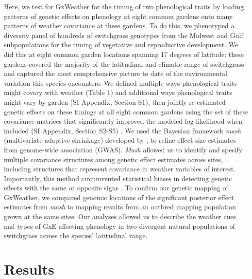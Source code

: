 \documentclass[
  9pt,
  twocolumn,
  twoside]{simple-article}%
\begin{document}
Here, we test for GxWeather for the timing of two phenological traits by
loading patterns of genetic effects on phenology at eight common gardens
onto many patterns of weather covariance at these gardens. To do this,
we phenotyped a diversity panel of hundreds of switchgrass genotypes
from the Midwest and Gulf subpopulations for the timing of vegetative
and reproductive development. We did this at eight common garden
locations spanning 17 degrees of latitude: these gardens covered the
majority of the latitudinal and climatic range of switchgrass and
captured the most comprehensive picture to date of the environmental
variation this species encounters. We defined multiple ways phenological
traits might covary with weather (Table 1) and additional ways
phenological traits might vary by garden (SI Appendix, Section S1), then
jointly re-estimated genetic effects on these timings at all eight
common gardens using the set of these covariance matrices that
significantly improved the modeled log-likelihood when included (SI
Appendix, Section S2-S5) \citet{urbut2019flexible}. We used the Bayesian
framework \emph{mash} (multivariate adaptive shrinkage) developed by
\citet{urbut2019flexible}, to refine effect size estimates from
genome-wide association (GWAS). \emph{Mash} allowed us to identify and
specify multiple covariance structures among genetic effect estimates
across sites, including structures that represent covariance in weather
variables of interest. Importantly, this method circumvented statistical
biases in detecting genetic effects with the same or opposite signs
\citet{10.1093/biostatistics/kxw041}. To confirm our genetic mapping of
GxWeather, we compared genomic locations of the significant posterior
effect estimates from \emph{mash} to mapping results from an outbred
mapping population grown at the same sites. Our analyses allowed us to
describe the weather cues and types of GxE affecting phenology in two
divergent natural populations of switchgrass across the species'
latitudinal range.

\section{Results}\label{results}
\end{document}
